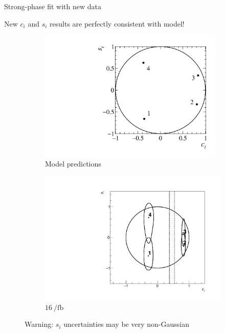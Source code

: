 \documentclass{beamer}
\begin{document}
\begin{frame}{Strong-phase fit with new data}
  \begin{center}
    {\large New $c_i$ and $s_i$ results are perfectly consistent with model!}
  \end{center}
  \vspace{-0.5cm}
  \begin{figure}
    \centering
    \begin{subfigure}{0.45\textwidth}
      \includegraphics[width = 0.97\textwidth]{Plots/StrongPhaseParametersPlot_cisi_4Bins.pdf}
      \caption{Model predictions}
    \end{subfigure}%
    \hspace{1cm}
    \begin{subfigure}{0.45\textwidth}
      \includegraphics[width = 1.0\textwidth]{Plots/Contours_cisi_16invfb.pdf}
      \caption{$\SI{16}{\per\femto\barn}$}
    \end{subfigure}
    \caption{Warning: $s_i$ uncertainties may be very non-Gaussian}
  \end{figure}
\end{frame}
\end{document}
